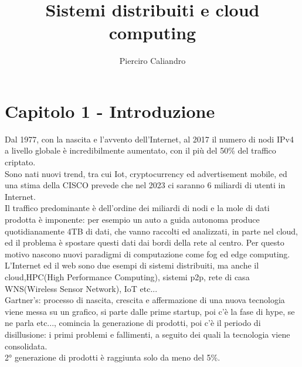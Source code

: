 \documentclass{article}
\begin{document}
\title{Sistemi distribuiti e cloud computing}
\author{Pierciro Caliandro}
\date{}
\maketitle
\tableofcontents
\large

\section{Capitolo 1 - Introduzione}
Dal 1977, con la nascita e l'avvento dell'Internet, al 2017 il numero di nodi IPv4 a livello globale è incredibilmente aumentato, con il più del 50\% del traffico criptato.\\
Sono nati nuovi trend, tra cui Iot, cryptocurrency ed advertisement mobile, ed una stima della CISCO prevede che nel 2023 ci saranno 6 miliardi di utenti in Internet.\\
Il traffico predominante è dell'ordine dei miliardi di nodi e la mole di dati prodotta è imponente: per esempio un auto a guida autonoma produce quotidianamente 4TB di dati, che vanno raccolti ed analizzati, in parte nel cloud, ed il problema è spostare questi dati dai bordi della rete al centro. Per questo motivo nascono nuovi paradigmi di computazione come fog ed edge computing.\\

L'Internet ed il web sono due esempi di sistemi distribuiti, ma anche il cloud,HPC(High Performance Computing), sistemi p2p, rete di casa WNS(Wireless Sensor Network), IoT etc...\\
Gartner's: processo di nascita, crescita e affermazione di una nuova tecnologia viene messa su un grafico, si parte dalle prime startup, poi c'è la fase di hype, se ne parla etc..., comincia la generazione di prodotti, poi c'è il periodo di disillusione: i primi problemi e fallimenti, a seguito dei quali la tecnologia viene consolidata.\\
2° generazione di prodotti è raggiunta solo da meno del 5\%.
\end{document}
